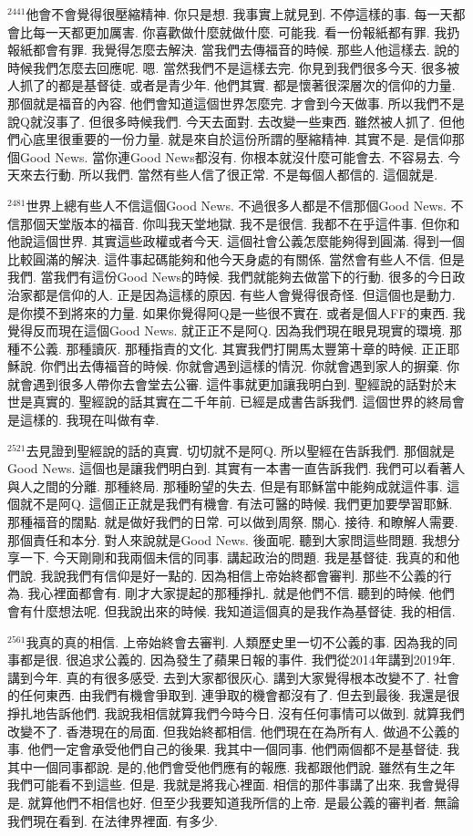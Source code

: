 \documentclass{book}
\begin{document}
$^{2441}$他會不會覺得很壓縮精神.
你只是想.
我事實上就見到.
不停這樣的事.
每一天都會比每一天都更加厲害.
你喜歡做什麼就做什麼.
可能我.
看一份報紙都有罪.
我扔報紙都會有罪.
我覺得怎麼去解決.
當我們去傳福音的時候.
那些人他這樣去.
說的時候我們怎麼去回應呢.
嗯.
當然我們不是這樣去完.
你見到我們很多今天.
很多被人抓了的都是基督徒.
或者是青少年.
他們其實.
都是懷著很深層次的信仰的力量.
那個就是福音的內容.
他們會知道這個世界怎麼完.
才會到今天做事.
所以我們不是說Q就沒事了.
但很多時候我們.
今天去面對.
去改變一些東西.
雖然被人抓了.
但他們心底里很重要的一份力量.
就是來自於這份所謂的壓縮精神.
其實不是.
是信仰那個Good News.
當你連Good News都沒有.
你根本就沒什麼可能會去.
不容易去.
今天來去行動.
所以我們.
當然有些人信了很正常.
不是每個人都信的.
這個就是.

$^{2481}$世界上總有些人不信這個Good News.
不過很多人都是不信那個Good News.
不信那個天堂版本的福音.
你叫我天堂地獄.
我不是很信.
我都不在乎這件事.
但你和他說這個世界.
其實這些政權或者今天.
這個社會公義怎麼能夠得到圓滿.
得到一個比較圓滿的解決.
這件事起碼能夠和他今天身處的有關係.
當然會有些人不信.
但是我們.
當我們有這份Good News的時候.
我們就能夠去做當下的行動.
很多的今日政治家都是信仰的人.
正是因為這樣的原因.
有些人會覺得很奇怪.
但這個也是動力.
是你摸不到將來的力量.
如果你覺得阿Q是一些很不實在.
或者是個人FF的東西.
我覺得反而現在這個Good News.
就正正不是阿Q.
因為我們現在眼見現實的環境.
那種不公義.
那種讀灰.
那種指責的文化.
其實我們打開馬太豐第十章的時候.
正正耶穌說.
你們出去傳福音的時候.
你就會遇到這樣的情況.
你就會遇到家人的摒棄.
你就會遇到很多人帶你去會堂去公審.
這件事就更加讓我明白到.
聖經說的話對於末世是真實的.
聖經說的話其實在二千年前.
已經是成書告訴我們.
這個世界的終局會是這樣的.
我現在叫做有幸.

$^{2521}$去見證到聖經說的話的真實.
切切就不是阿Q.
所以聖經在告訴我們.
那個就是Good News.
這個也是讓我們明白到.
其實有一本書一直告訴我們.
我們可以看著人與人之間的分離.
那種終局.
那種盼望的失去.
但是有耶穌當中能夠成就這件事.
這個就不是阿Q.
這個正正就是我們有機會.
有法可醫的時候.
我們更加要學習耶穌.
那種福音的闊點.
就是做好我們的日常.
可以做到周祭.
關心.
接待.
和瞭解人需要.
那個責任和本分.
對人來說就是Good News.
後面呢.
聽到大家問這些問題.
我想分享一下.
今天剛剛和我兩個未信的同事.
講起政治的問題.
我是基督徒.
我真的和他們說.
我說我們有信仰是好一點的.
因為相信上帝始終都會審判.
那些不公義的行為.
我心裡面都會有.
剛才大家提起的那種掙扎.
就是他們不信.
聽到的時候.
他們會有什麼想法呢.
但我說出來的時候.
我知道這個真的是我作為基督徒.
我的相信.

$^{2561}$我真的真的相信.
上帝始終會去審判.
人類歷史里一切不公義的事.
因為我的同事都是很.
很追求公義的.
因為發生了蘋果日報的事件.
我們從2014年講到2019年.
講到今年.
真的有很多感受.
去到大家都很灰心.
講到大家覺得根本改變不了.
社會的任何東西.
由我們有機會爭取到.
連爭取的機會都沒有了.
但去到最後.
我還是很掙扎地告訴他們.
我說我相信就算我們今時今日.
沒有任何事情可以做到.
就算我們改變不了.
香港現在的局面.
但我始終都相信.
他們現在在為所有人.
做過不公義的事.
他們一定會承受他們自己的後果.
我其中一個同事.
他們兩個都不是基督徒.
我其中一個同事都說.
是的,他們會受他們應有的報應.
我都跟他們說.
雖然有生之年我們可能看不到這些.
但是.
我就是將我心裡面.
相信的那件事講了出來.
我會覺得是.
就算他們不相信也好.
但至少我要知道我所信的上帝.
是最公義的審判者.
無論我們現在看到.
在法律界裡面.
有多少.
\end{document}
